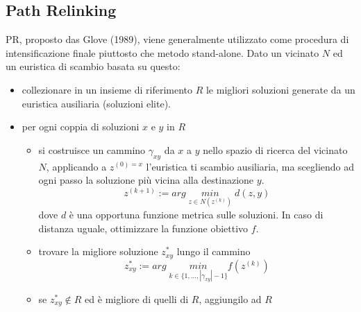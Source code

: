 \documentclass{article}
\begin{document}
\subsection{Path Relinking}
PR, proposto das Glove (1989), viene generalmente utilizzato come procedura di intensificazione
finale piuttosto che metodo stand-alone.
Dato un vicinato $N$ ed un euristica di scambio basata su questo:
\begin{itemize}
    \item collezionare in un insieme di riferimento $R$ le migliori soluzioni generate da
    un euristica ausiliaria (soluzioni elite).
    \item per ogni coppia di soluzioni $x$ e $y$ in $R$
    \begin{itemize}
        \item si costruisce un cammino $\gamma_{xy}$ da $x$ a $y$ nello spazio di ricerca
        del vicinato $N$, applicando a $z^{(0)=x}$ l'euristica ti scambio ausiliaria,
        ma scegliendo ad ogni passo la soluzione più vicina alla destinazione $y$.
        $$z^{(k+1)}:=arg\;\underset{z\in N(z^{(k)})}{min}\; d(z,y)$$
        dove $d$ è una opportuna funzione metrica sulle soluzioni. In caso di distanza
        uguale, ottimizzare la funzione obiettivo $f$.

        \item trovare la migliore soluzione $z_{xy}^*$ lungo il cammino
        $$z^*_{xy}:=arg\;\underset{k\in\{1,\dots,|\gamma_{xy}|-1\}}{min}f(z^{(k)})$$
\item se $z^*_{xy}\notin R$ ed è migliore di quelli di $R$, aggiungilo ad $R$
    \end{itemize}

\end{itemize}
\end{document}
